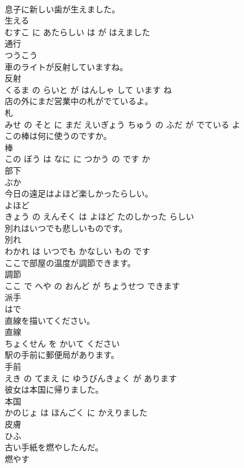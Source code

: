 \documentclass[8pt]{extreport}
\begin{document}
\begin{CJK}{UTF8}{min}
\\	息子に新しい歯が生えました。	
\\	生える 
\\	むすこ に あたらしい は が はえました			
\\	通行	
\\	つうこう		
\\	車のライトが反射していますね。	
\\	反射 
\\	くるま の らいと が はんしゃ して います ね			
\\	店の外にまだ営業中の札がでているよ。	
\\	札 
\\	みせ の そと に まだ えいぎょう ちゅう の ふだ が でている よ			
\\	この棒は何に使うのですか。	
\\	棒 
\\	この ぼう は なに に つかう の です か			
\\	部下	
\\	ぶか		
\\	今日の遠足はよほど楽しかったらしい。	
\\	よほど 
\\	きょう の えんそく は よほど たのしかった らしい			
\\	別れはいつでも悲しいものです。	
\\	別れ 
\\	わかれ は いつでも かなしい もの です			
\\	ここで部屋の温度が調節できます。	
\\	調節 
\\	ここ で へや の おんど が ちょうせつ できます			
\\	派手	
\\	はで		
\\	直線を描いてください。	
\\	直線 
\\	ちょくせん を かいて ください			
\\	駅の手前に郵便局があります。	
\\	手前 
\\	えき の てまえ に ゆうびんきょく が あります			
\\	彼女は本国に帰りました。	
\\	本国 
\\	かのじょ は ほんごく に かえりました			
\\	皮膚	
\\	ひふ		
\\	古い手紙を燃やしたんだ。	
\\	燃やす 

\end{CJK}
\end{document}
